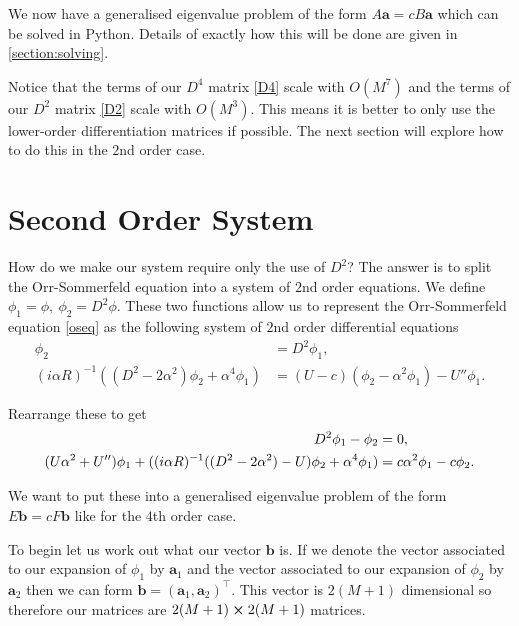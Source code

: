 We now have a generalised eigenvalue problem of the form $ A \mathbf{a} = c B \mathbf{a} $ which can be solved in Python. Details of exactly how this will be done are given in \ref{section:solving}.

Notice that the terms of our $ D^4 $ matrix \eqref{D4} scale with $ O(M^7) $ and the terms of our $ D^2 $ matrix \eqref{D2} scale with $ O(M^3) $. This means it is better to only use the lower-order differentiation matrices if possible. The next section will explore how to do this in the $2$nd order case. 

\section{Second Order System}
How do we make our system require only the use of $D^2$? The answer is to split the Orr-Sommerfeld equation into a system of $2$nd order equations. We define $ \phi_1 = \phi,\ \phi_2 = D^2 \phi $. These two functions allow us to represent the Orr-Sommerfeld equation \eqref{oseq} as the following system of $2$nd order differential equations
\begin{align}
    \phi_2 &= D^2 \phi_1, \\
    (i \alpha R)^{-1} ((D^2 - 2 \alpha^2) \phi_2 + \alpha^4 \phi_1) &= (U - c)(\phi_2 - \alpha^2 \phi_1) - U'' \phi_1.
    \label{2ndorder}
\end{align}

Rearrange these to get
\begin{subequations}
\begin{align}
    D^2 \phi_1 - \phi_2 &= 0, \label{2ndeq1} \\
    (U \alpha^2 + U'') \phi_1 + ((i \alpha R)^{-1} ((D^2 - 2 \alpha^2) - U) \phi_2 + \alpha^4 \phi_1) &= c \alpha^2 \phi_1- c\phi_2. \label{2ndeq2}
\end{align}
\end{subequations}

We want to put these into a generalised eigenvalue problem of the form $ E \mathbf{b} = c F \mathbf{b} $ like for the $4$th order case.

To begin let us work out what our vector $ \mathbf{b} $ is. If we denote the vector associated to our expansion of $ \phi_1 $ by $\mathbf{a}_1$ and the vector associated to our expansion of $ \phi_2 $ by $ \mathbf{a}_2 $ then we can form $ \mathbf{b} = (\mathbf{a}_1, \mathbf{a}_2)^\intercal $. This vector is $ 2(M+1) $ dimensional so therefore our matrices are $ 2(M+1) \cross 2(M+1) $ matrices. 

